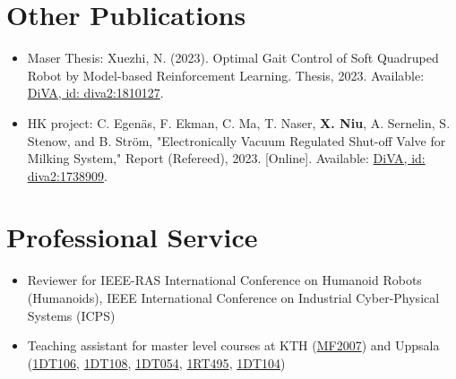 \documentclass[a4paper,11pt]{article}
\newcommand{\resumeSubHeadingListStart}{\begin{itemize}[leftmargin=*,labelsep=0mm]}
\newcommand{\resumeSubHeadingListEnd}{\end{itemize}\vspace{2mm}}
\begin{document}
\section{\textbf{Other Publications}}
\resumeSubHeadingListStart
\vspace{3mm}
  \item \hspace{0.3mm} Maser Thesis: Xuezhi, N. (2023). Optimal Gait Control of Soft Quadruped Robot by Model-based Reinforcement Learning. Thesis, 2023. Available: \href{https://urn.kb.se/resolve?urn=urn:nbn:se:kth:diva-339056}{DiVA, id: diva2:1810127}.
  
  \item \hspace{0.3mm} HK project: C. Egenäs, F. Ekman, C. Ma, T. Naser, \textbf{X. Niu}, A. Sernelin, S. Stenow, and B. Ström, "Electronically Vacuum Regulated Shut-off Valve for Milking System," Report (Refereed), 2023. [Online]. Available: \href{https://urn.kb.se/resolve?urn=urn:nbn:se:kth:diva-324226}{DiVA, id: diva2:1738909}.
\resumeSubHeadingListEnd
\vspace{-5.5mm}

\section{\textbf{Professional Service}}
\resumeSubHeadingListStart
  \item \hspace{0.5em} Reviewer for IEEE-RAS International Conference on Humanoid Robots (Humanoids), IEEE International Conference on Industrial Cyber-Physical Systems (ICPS) 
  \vspace{-0.5em}
  \item \hspace{0.5em} Teaching assistant for master level courses at KTH (\href{https://www.kth.se/student/kurser/kurs/MF2007}{MF2007}) and Uppsala (\href{https://www.uu.se/en/study/course?query=1DT106}{1DT106}, \href{https://www.uu.se/en/study/course?query=1DT108}{1DT108}, \href{https://www.uu.se/en/study/course?query=1DT054}{1DT054},
  \href{https://www.uu.se/en/study/course?query=1RT495}{1RT495}, \href{https://www.uu.se/en/study/course?query=1DT104}{1DT104})
  \vspace{-0.6em}
\resumeSubHeadingListEnd
\vspace{-5mm}
\end{document}
